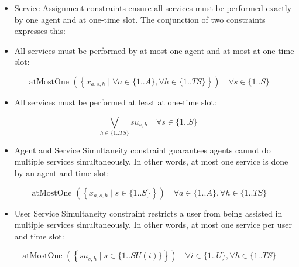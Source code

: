 \documentclass[10pt]{article}
\begin{document}
\begin{itemize}
  \item Service Assignment constraints ensure all services must be performed exactly by one agent and at one-time slot. The conjunction of two constraints expresses this:
  \item All services must be performed by at most one agent and at most at one-time slot:
\end{itemize}


\begin{equation*}
\text { atMostOne }\left(\left\{x_{a, s, h} \mid \forall a \in\{1 . . A\}, \forall h \in\{1 . . T S\}\right\}\right) \quad \forall s \in\{1 . . S\} \tag{7}
\end{equation*}


\begin{itemize}
  \item All services must be performed at least at one-time slot:
\end{itemize}


\begin{equation*}
\bigvee_{h \in\{1 . . T S\}} s u_{s, h} \quad \forall s \in\{1 . . S\} \tag{8}
\end{equation*}


\begin{itemize}
  \item Agent and Service Simultaneity constraint guarantees agents cannot do multiple services simultaneously. In other words, at most one service is done by an agent and time-slot:
\end{itemize}


\begin{equation*}
\text { atMostOne }\left(\left\{x_{a, s, h} \mid s \in\{1 . . S\}\right\}\right) \quad \forall a \in\{1 . . A\}, \forall h \in\{1 . . T S\} \tag{9}
\end{equation*}


\begin{itemize}
  \item User Service Simultaneity constraint restricts a user from being assisted in multiple services simultaneously. In other words, at most one service per user and time slot:
\end{itemize}


\begin{equation*}
\text { atMostOne }\left(\left\{s u_{s, h} \mid s \in\{1 . . S U(i)\}\right\}\right) \quad \forall i \in\{1 . . U\}, \forall h \in\{1 . . T S\} \tag{10}
\end{equation*}
\end{document}
